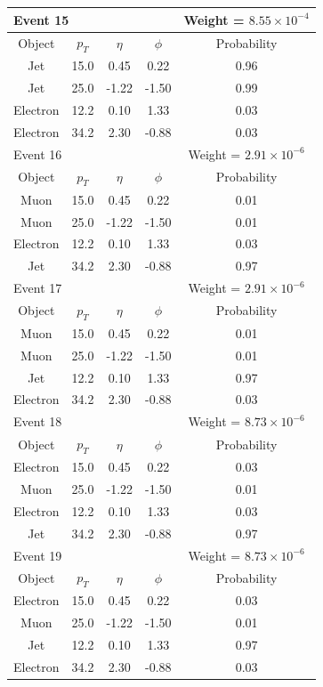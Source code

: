 \documentclass{cmspaper}
\begin{document}
\begin{tabular}{|c|c|c|c|c|}\hline 
\multicolumn{4}{|l|}{Event 15} & Weight = $8.55 \times 10^{-4}$ \\
\hline
Object & $p_T$ & $\eta$ & $\phi$ & Probability \\ 
 \hline 
Jet & 15.0 & 0.45 & 0.22 & 0.96 \\
Jet & 25.0 & -1.22 & -1.50 & 0.99 \\
Electron & 12.2 & 0.10 & 1.33 &  0.03 \\
Electron & 34.2 & 2.30 & -0.88 & 0.03 \\
 \hline 
 \hline 

\multicolumn{4}{|l|}{Event 16} & Weight = $2.91 \times 10^{-6}$ \\
\hline
Object & $p_T$ & $\eta$ & $\phi$ & Probability \\ 
 \hline 
Muon & 15.0 & 0.45 & 0.22 & 0.01 \\
Muon & 25.0 & -1.22 & -1.50 & 0.01 \\
Electron & 12.2 & 0.10 & 1.33 &  0.03 \\
Jet & 34.2 & 2.30 & -0.88 & 0.97 \\
 \hline 
 \hline 

\multicolumn{4}{|l|}{Event 17} & Weight = $2.91 \times 10^{-6}$ \\
\hline
Object & $p_T$ & $\eta$ & $\phi$ & Probability \\ 
 \hline 
Muon & 15.0 & 0.45 & 0.22 & 0.01 \\
Muon & 25.0 & -1.22 & -1.50 & 0.01 \\
Jet & 12.2 & 0.10 & 1.33 &  0.97 \\
Electron & 34.2 & 2.30 & -0.88 & 0.03 \\
 \hline 
 \hline 

\multicolumn{4}{|l|}{Event 18} & Weight = $8.73 \times 10^{-6}$ \\
\hline
Object & $p_T$ & $\eta$ & $\phi$ & Probability \\ 
 \hline 
Electron & 15.0 & 0.45 & 0.22 & 0.03 \\
Muon & 25.0 & -1.22 & -1.50 & 0.01 \\
Electron & 12.2 & 0.10 & 1.33 &  0.03 \\
Jet & 34.2 & 2.30 & -0.88 & 0.97 \\
 \hline 
 \hline 

\multicolumn{4}{|l|}{Event 19} & Weight = $8.73 \times 10^{-6}$ \\
\hline
Object & $p_T$ & $\eta$ & $\phi$ & Probability \\ 
 \hline 
Electron & 15.0 & 0.45 & 0.22 & 0.03 \\
Muon & 25.0 & -1.22 & -1.50 & 0.01 \\
Jet & 12.2 & 0.10 & 1.33 &  0.97 \\
Electron & 34.2 & 2.30 & -0.88 & 0.03 \\
 \hline 
 \hline 


\end{tabular}
\end{document}
